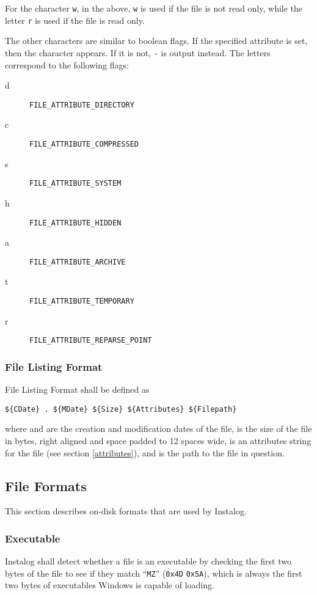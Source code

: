 For the character \verb|w|, in the above, \verb|w| is used if the file is not
read only, while the letter \verb|r| is used if the file is read only.

The other characters are similar to boolean flags. If the specified attribute is
set, then the character appears. If it is not, \verb|-| is output instead. The
letters correspond to the following flags:
\begin{description}
\item[d] \verb|FILE_ATTRIBUTE_DIRECTORY|
\item[c] \verb|FILE_ATTRIBUTE_COMPRESSED|
\item[s] \verb|FILE_ATTRIBUTE_SYSTEM|
\item[h] \verb|FILE_ATTRIBUTE_HIDDEN|
\item[a] \verb|FILE_ATTRIBUTE_ARCHIVE|
\item[t] \verb|FILE_ATTRIBUTE_TEMPORARY|
\item[r] \verb|FILE_ATTRIBUTE_REPARSE_POINT|
\end{description}

\subsubsection{File Listing Format} \label{filelisting}
File Listing Format shall be defined as
\begin{verbatim}
${CDate} . ${MDate} ${Size} ${Attributes} ${Filepath}
\end{verbatim}
where  and  are the creation and modification dates of the
file,  is the size of the file in bytes, right aligned and space
padded to 12 spaces wide,  is an attributes string for the file
(see section \ref{attributes}), and  is the path to the file in
question.

\subsection{File Formats}
This section describes on-disk formats that are used by Instalog.

\subsubsection{Executable} \label{executables}
Instalog shall detect whether a file is an executable by checking the first two
bytes of the file to see if they match ``\verb|MZ|'' (\verb|0x4D| \verb|0x5A|),
which is always the first two bytes of executables Windows is capable of
loading.

